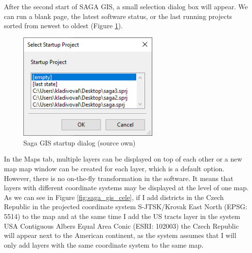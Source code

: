 \documentclass[a4paper,10pt,twoside]{article}
\begin{document}
After the second start of SAGA GIS, a small selection dialog box will appear. We can run a blank page, the latest software status, or the last running projects sorted from newest to oldest (Figure \ref{fig:saga_startup}).

\vspace{0.3cm}
\begin{figure}[hbt!] 
\begin{center}
\includegraphics[width=7cm]{../pictures/saga_startup.png} 
\caption[Saga GIS startup dialog (source own)]{Saga GIS startup dialog (source own)}
\label{fig:saga_startup}
\end{center}
\end{figure}

In the Maps tab, multiple layers can be displayed on top of each other or a new map map window can be created for each layer, which is a default option. However, there is no on-the-fly transformation in the software. It means that layers with different coordinate systems may be displayed at the level of one map. As we can see in Figure \ref{fig:saga_gis_cele}, if I add districts in the Czech Republic in the projected coordinate system S-JTSK/Krovak East North (EPSG: 5514) to the map and at the same time I add the US tracts layer in the system USA Contiguous Albers Equal Area Conic (ESRI: 102003) the Czech Republic will appear next to the American continent, as the system assumes that I will only add layers with the same coordinate system to the same map.
\end{document}
